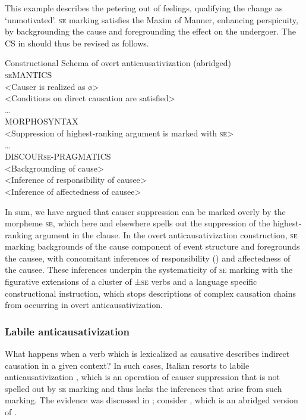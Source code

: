 \documentclass[output=paper,colorlinks,citecolor=brown
]{langscibook}
\begin{document}
This example describes the petering out of feelings, qualifying the change as ‘unmotivated’. \textsc{se} marking satisfies the Maxim of Manner, enhancing perspicuity, by backgrounding the cause and foregrounding the effect on the undergoer. The CS in  should thus be revised as follows.

\ea \label{bentley_example_58}
Constructional Schema of overt anticausativization (abridged)\\
\textsc{se}MANTICS\\
<Causer is realized as \o>\\
<Conditions on direct causation are satisfied>\\
 \ldots \\
MORPHOSYNTAX\\
<Suppression of highest-ranking argument is marked with \textsc{se}>\\
 \ldots \\
DISCOUR\textsc{se}-PRAGMATICS\\
<Backgrounding of cause>\\
<Inference of responsibility of causee>\\
<Inference of affectedness of causee>\\
\z

In sum, we have argued that causer suppression can be marked overly by the morpheme \textsc{se}, which here and elsewhere spells out the suppression of the highest-ranking argument in the clause. In the overt anticausativization construction, \textsc{se} marking backgrounds of the cause component of event structure and foregrounds the causee, with concomitant inferences of responsibility (\cites[24 and references therein]{zribi1987reflexivite}{kailuweit2012construcciones}{martin2014anticausatives}) and affectedness \citep{lyons1969introduction} of the causee. These inferences underpin the systematicity of \textsc{se} marking with the figurative extensions of a cluster of ±\textsc{se} verbs and a language specific constructional instruction, which stops descriptions of complex causation chains from occurring in overt anticausativization. 

\subsubsection{Labile anticausativization}
\label{bentley_section_5.4.2}
What happens when a verb which is lexicalized as causative describes indirect causation in a given
context? In such cases, Italian resorts to labile anticausativization \citep{bentley2021two}, which
is an operation of causer suppression that is not spelled out by \textsc{se} marking and thus lacks
the inferences that arise from such marking. The evidence was discussed in ; consider , which is an abridged version of . 
\end{document}
